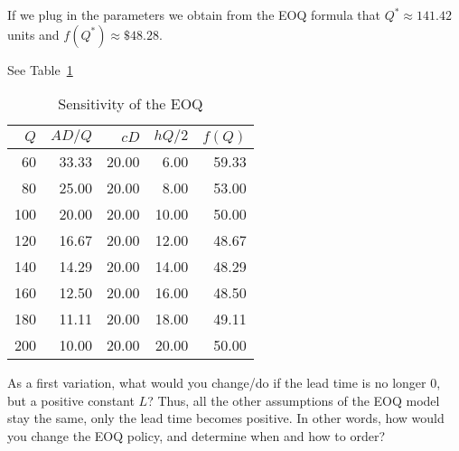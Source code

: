   \begin{solution}

If we plug in the parameters we obtain from the EOQ formula that $Q^{*} \approx 141.42$ units and $f(Q^{*}) \approx \mathdollar 48.28$.

See Table~\ref{tab:sensitivity}
\begin{table}[htbp]
  \centering
    \begin{tabular}{rrrrr}
    \toprule
    $Q$   & $AD/Q$  & $cD$  & $hQ/2$  & $f(Q)$ \\
    \midrule
    60    & 33.33   & 20.00 & 6.00    & 59.33 \\
    80    & 25.00   & 20.00 & 8.00    & 53.00 \\
    100   & 20.00   & 20.00 & 10.00   & 50.00 \\
    120   & 16.67   & 20.00 & 12.00   & 48.67 \\
    140   & 14.29   & 20.00 & 14.00   & 48.29 \\
    160   & 12.50   & 20.00 & 16.00   & 48.50 \\
    180   & 11.11   & 20.00 & 18.00   & 49.11 \\
    200   & 10.00   & 20.00 & 20.00   & 50.00 \\
    \bottomrule
    \end{tabular}%
\caption{Sensitivity of the EOQ}
\label{tab:sensitivity}
\end{table}%
  \end{solution}

\begin{question}
  As a first variation, what would you change/do if the lead time
  is no longer 0, but a positive constant  $L$? Thus, all the other
  assumptions of the EOQ model stay the same, only the lead time
  becomes positive.  In other words, how would you change the EOQ
  policy, and determine when and how to order?

\end{question}

